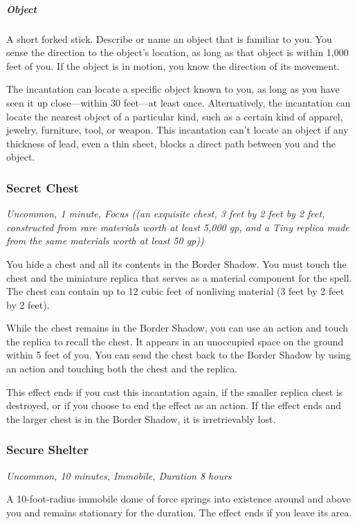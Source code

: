 \subparagraph*{Object} A short forked stick. Describe or name an object that is familiar to you. You sense the direction to the object's location, as long as that object is within 1,000 feet of you. If the object is in motion, you know the direction of its movement.

The incantation can locate a specific object known to you, as long as you have seen it up close—within 30 feet—at least once. Alternatively, the incantation can locate the nearest object of a particular kind, such as a certain kind of apparel, jewelry, furniture, tool, or weapon. This incantation can't locate an object if any thickness of lead, even a thin sheet, blocks a direct path between you and the object.

\subsubsection{Secret Chest}
\textit{Uncommon, 1 minute, Focus ((an exquisite chest, 3 feet by 2 feet by 2 feet, constructed from rare materials worth at least 5,000 gp, and a Tiny replica made from the same materials worth at least 50 gp))}

You hide a chest and all its contents in the Border Shadow. You must touch the chest and the miniature replica that serves as a material component for the spell. The chest can contain up to 12 cubic feet of nonliving material (3 feet by 2 feet by 2 feet).

While the chest remains in the Border Shadow, you can use an action and touch the replica to recall the chest. It appears in an unoccupied space on the ground within 5 feet of you. You can send the chest back to the Border Shadow by using an action and touching both the chest and the replica.

This effect ends if you cast this incantation again, if the smaller replica chest is destroyed, or if you choose to end the effect as an action. If the effect ends and the larger chest is in the Border Shadow, it is irretrievably lost.

\subsubsection{Secure Shelter}
\textit{Uncommon, 10 minutes, Immobile, Duration 8 hours}

A 10-foot-radius immobile dome of force springs into existence around and above you and remains stationary for the duration. The effect ends if you leave its area.

